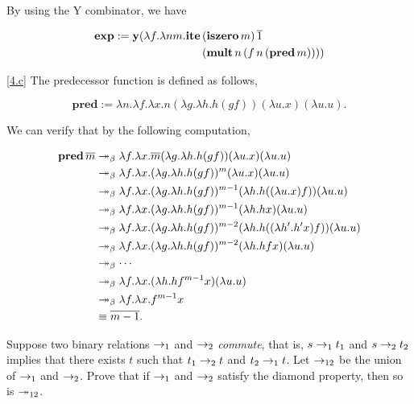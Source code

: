 \documentclass{homework}
\begin{document}
\begin{solution}
  By using the Y combinator, we have

  \begin{align*}
    \mathbf{exp} := \mathbf{y}(\lambda f.\lambda nm. \mathbf{ite}\, & (\mathbf{iszero}\, m)\, \overline{1} \\
    & (\mathbf{mult}\, n\, (f\, n\, (\mathbf{pred}\, m) )))
  \end{align*}

  \ref{4.c} The predecessor function is defined as follows,

  \begin{equation*}
    \mathbf{pred} := \lambda n.\lambda f.\lambda x.n(\lambda g.\lambda h.h(gf))(\lambda u.x)(\lambda u.u).
  \end{equation*}

  We can verify that by the following computation,

  \begin{align*}
    \mathbf{pred}\, \overline{m} &\twoheadrightarrow_{\beta} \lambda f.\lambda x.\overline{m}(\lambda g.\lambda h.h(gf))(\lambda u.x)(\lambda u.u) \\
    &\twoheadrightarrow_{\beta} \lambda f.\lambda x.(\lambda g.\lambda h.h(gf))^m(\lambda u.x)(\lambda u.u) \\
    &\twoheadrightarrow_{\beta} \lambda f.\lambda x.(\lambda g.\lambda h.h(gf))^{m-1}(\lambda h.h((\lambda u.x) f))(\lambda u.u) \\
    &\twoheadrightarrow_{\beta} \lambda f.\lambda x.(\lambda g.\lambda h.h(gf))^{m-1}(\lambda h.hx)(\lambda u.u) \\
    &\twoheadrightarrow_{\beta} \lambda f.\lambda x.(\lambda g.\lambda h.h(gf))^{m-2}(\lambda h.h((\lambda h'.h'x)f))(\lambda u.u) \\
    &\twoheadrightarrow_{\beta} \lambda f.\lambda x.(\lambda g.\lambda h.h(gf))^{m-2}(\lambda h.hfx)(\lambda u.u) \\
    &\twoheadrightarrow_{\beta} \cdots \\
    &\twoheadrightarrow_{\beta} \lambda f.\lambda x.(\lambda h.hf^{m-1}x)(\lambda u.u) \\
    &\twoheadrightarrow_{\beta} \lambda f.\lambda x.f^{m-1}x \\
    &\equiv \overline{m-1}.
  \end{align*}

\end{solution}

\begin{problem}
  Suppose two binary relations $\rightarrow_{1}$ and $\rightarrow_{2}$ \emph{commute},
  that is, $s \rightarrow_{1} t_{1}$ and $s \rightarrow_{2} t_{2}$ implies that there exists
  $t$ such that $t_{1} \rightarrow_{2} t$ and $t_{2} \rightarrow_{1} t$.
  Let $\rightarrow_{12}$ be the union of $\rightarrow_{1}$ and $\rightarrow_{2}$.
  Prove that if $\rightarrow_{1}$ and $\rightarrow_{2}$ satisfy the diamond property, then so
  is $\twoheadrightarrow_{12}$.
\end{problem}
\end{document}
